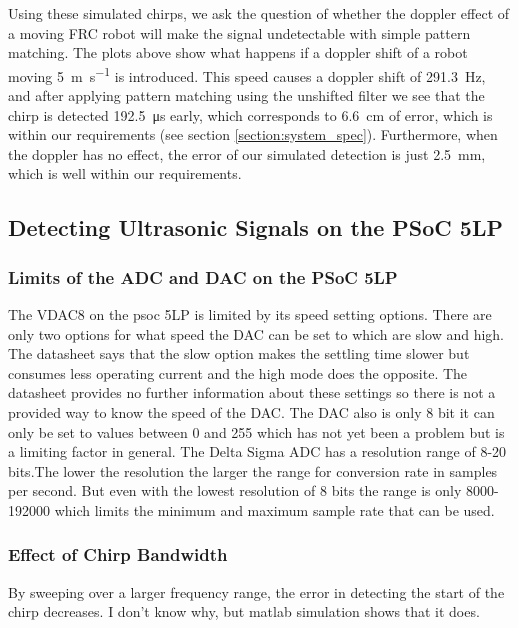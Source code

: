 \documentclass{article}
\begin{document}
    Using these simulated chirps, we ask the question of whether the doppler effect of a moving FRC robot will make the signal undetectable with simple pattern matching. The plots above show what happens if a doppler shift of a robot moving \SI{5}{\meter\per\second} is introduced. This speed causes a doppler shift of \SI{291.3}{\hertz}, and after applying pattern matching using the unshifted filter we see that the chirp is detected \SI{192.5}{\micro\second} early, which corresponds to \SI{6.6}{\centi\meter} of error, which is within our requirements (see section \ref{section:system_spec}). Furthermore, when the doppler has no effect, the error of our simulated detection is just \SI{2.5}{\milli\meter}, which is well within our requirements.

  \subsection{Detecting Ultrasonic Signals on the PSoC 5LP}

    \subsubsection{Limits of the ADC and DAC on the PSoC 5LP}

	The VDAC8 on the psoc 5LP is limited by its speed setting options. There are only two options for what speed the DAC can be set to which are slow and high. The datasheet says that the slow option makes the settling time slower but consumes less operating current and the high mode does the opposite. The datasheet provides no further information about these settings so there is not a provided way to know the speed of the DAC. The DAC also is only 8 bit it can only be set to values between 0 and 255 which has not yet been a problem but is a limiting factor in general.
    The Delta Sigma ADC has a resolution range of 8-20 bits.The lower the resolution the larger the range for conversion rate in samples per second. But even with the lowest resolution of 8 bits the range is only 8000-192000 which limits the minimum and maximum sample rate that can be used.

    \subsubsection{Effect of Chirp Bandwidth}

    By sweeping over a larger frequency range, the error in detecting the start of the chirp decreases. I don't know why, but matlab simulation shows that it does.
\end{document}
